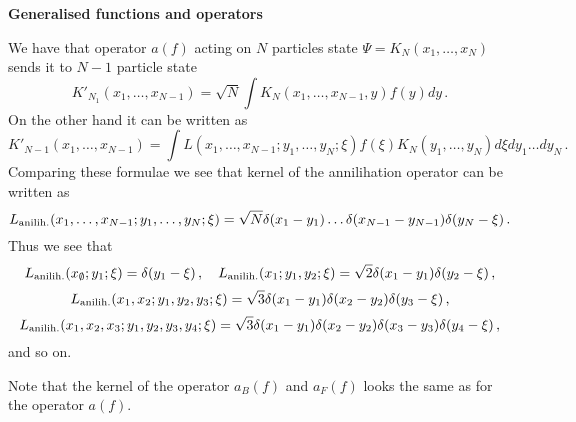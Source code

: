 

\baselineskip=14pt
\def\vare {\varepsilon}
\def\t {\tilde}
\def\a {\alpha}
\def\K {{\bf K}}
\def\N {{\bf N}}
\def\C {{\bf C}}
\def\L {{\cal L}}
\def\E {{\bf E}}
\def\s {{\sigma}}
\def\S {{\cal S}}
\def\SS {{\Sigma}}
\def\p{\partial}
\def\vare{{\varepsilon}}
\def\Q {{\bf Q}}
\def\D {{\cal D}}
\def\G {{\Gamma}}
\def\Z {{\bf Z}}
\def\R  {{\bf R}}
\def\l {\lambda}
\def\ll {{\bf l}}
\def\degree {{\bf {\rm degree}\,\,}}
\def \finish {${\,\,\vrule height1mm depth2mm width 8pt}$}
\def \m {\medskip}
\def\p {\partial}
\def\r {{\bf r}}
\def\pt {{\bf p}}
\def\v {{\bf v}}
\def\n {{\bf n}}
\def\t {{\bf t}}
\def\b {{\bf b}}
\def\c {{\bf c }}
\def\e{{\bf e}}
\def\f{{\bf f}}
\def\ac {{\bf a}}
\def \X   {{\bf X}}
\def \Y   {{\bf Y}}
\def \x   {{\bf x}}
\def \y   {{\bf y}}
\def\w {{\omega}}
\def \Tr  {{\rm Tr\,}}
\def\dim {{\rm dim\,\,}}
\def\t {{\tilde}} 
\def\dist {{\hbox{\tt "distance"}}}
\def  \dim {{\rm dim\,}}
\def  \Im  {{\rm Im\,}}
\def  \ker {{\rm ker\,}}


\def \Cl {\hbox{\tt Cliff}}
\def\F {\cal F}

\centerline {\bf Generalised functions and operators}

  We have that operator $a(f)$ acting on $N$ particles
state $\Psi=K_N(x_1,\dots,x_N)$ sends it to $N-1$
particle state
        $$
K'_{N_1}(x_1,\dots,x_{N-1})=\sqrt N\int
K_N(x_1,\dots,x_{N-1},y)f(y)dy\,.
       $$
On the other hand it can be written as
           $$
K'_{N-1}(x_1,\dots,x_{N-1})=
      \int
L(x_1,\dots,x_{N-1};
y_1,\dots,y_N;\xi)
f(\xi)K_N(y_1,\dots,y_N)d\xi dy_1\dots dy_N\,.
           $$
     Comparing these formulae we see that
  kernel of the annilihation operator
can be written as
         $$
L_{\rm anilih.}(x_1,\dots,x_{N-1};
y_1,\dots,y_N;\xi)=
\sqrt {N}
  \delta(x_1-y_1)
   \dots
  \delta (x_{N-1}-y_{N-1})
   \delta (y_N-\xi)\,.
           $$
Thus we see that
        $$
L_{\rm anilih.}(x_{\emptyset};
y_1;\xi)=
   \delta (y_1-\xi)\,,\quad
L_{\rm anilih.}(x_1;
y_1,y_2;\xi)=
\sqrt {2}
  \delta (x_1-y_1)
   \delta (y_2-\xi)\,,
       $$
   $$
L_{\rm anilih.}(x_1,x_2;
y_1,y_2,y_3;\xi)=
\sqrt {3}
  \delta (x_1-y_1)
  \delta (x_2-y_2)
   \delta (y_3-\xi)\,,   
  $$
   $$
L_{\rm anilih.}(x_1,x_2,x_3;
y_1,y_2,y_3,y_4;\xi)=
\sqrt {3}
  \delta (x_1-y_1)
  \delta (x_2-y_2)
  \delta (x_3-y_3)
   \delta (y_4-\xi)\,,   
  $$
and so on.

Note that the kernel of the operator $a_B(f)$ and $a_F(f)$
looks the same as for the operator $a(f)$.

